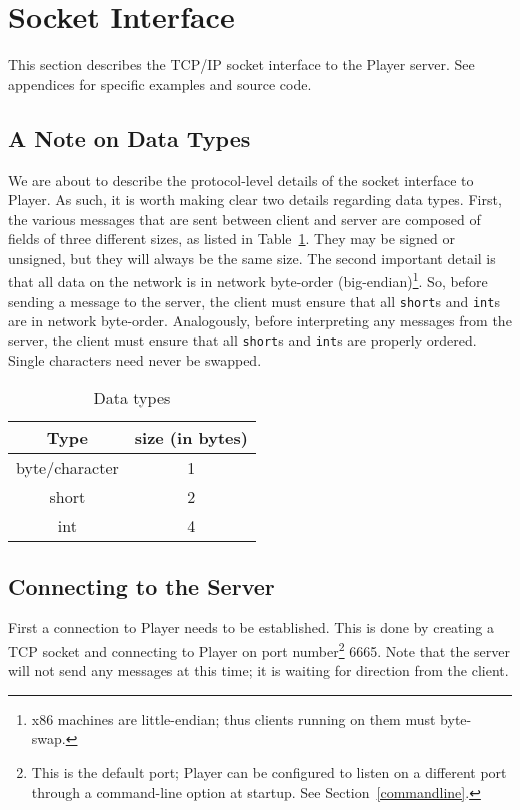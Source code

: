 \documentclass[11pt]{article}
\begin{document}
\newpage
\section{Socket Interface}

This section describes the TCP/IP socket interface to the Player server. 
See appendices for specific examples and source code.

\subsection{A Note on Data Types}
We are about to describe the protocol-level details of the socket
interface to Player.  As such, it is worth making clear two details
regarding data types.  First, the various messages that are sent
between client and server are composed of fields of three different
sizes, as listed in Table~\ref{datatypes}.  They may be signed
or unsigned, but they will always be the same size.  The second
important detail is that all data on the network is in network
byte-order (big-endian)\footnote{x86 machines are little-endian;
thus clients running on them must byte-swap.}.  
So, before sending a message to the
server, the client must ensure that all {\tt short}s and {\tt int}s
are in network byte-order.  Analogously, before interpreting any messages
from the server, the client must ensure that all {\tt short}s
and {\tt int}s are properly ordered.  Single characters need never
be swapped.

\begin{table}[h]

\begin{center}
\begin{tabular}{|c|c|}
\hline
Type & size (in bytes) \\
\hline
byte/character & 1 \\
\hline
short & 2 \\
\hline
int & 4 \\
\hline
\end{tabular}
\end{center}
\caption{Data types}
\label{datatypes}
\end{table}

\subsection{Connecting to the Server}

First a connection to Player needs to be established. This is done
by creating a TCP socket and connecting to Player on port number\footnote{This 
is the default port; Player can be configured to listen on 
a different port through a command-line option at startup.  See 
Section~\ref{commandline}.} 6665.  Note that the server will not send any 
messages at this time; it is waiting for direction from the client.
\end{document}
